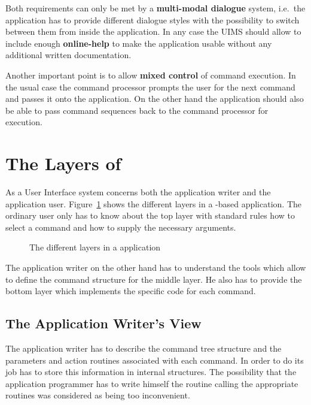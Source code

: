 Both requirements can only be met by a 
\textbf{multi-modal dialogue}
system, i.e.\ the application has to provide different dialogue
styles with the possibility to switch between them from inside the
application. 
In any case the UIMS should allow to include enough 
\textbf{online-help}
to make the application usable without any additional written documentation.

Another important point is to allow 
\textbf{mixed control}
of command execution.
In the usual case the command processor prompts the user for the next
command and passes it onto the application.
On the other hand the application should also be able to pass command
sequences back to the command processor for execution.

%
%
\section{The Layers of \KUIP{}}

As a User Interface system \KUIP{} concerns both the application
writer and the application user.
Figure~\ref{FIG2} shows the different layers in a \KUIP{}-based application.
The ordinary user only has to know about the top layer with standard
rules how to select a command and how to supply the necessary arguments.

\begin{figure}[tb]
\begin{center}
\mbox{}
\end{center}
\caption{The different layers in a \KUIP{} application}
\label{FIG2}
\end{figure}

The application writer on the other hand has to understand the tools
which allow to define the command structure for the middle layer.
He also has to provide the bottom layer which implements the specific code
for each command.

%
%
\subsection{The Application Writer's View}

The application writer has to describe the command tree structure and
the parameters and action routines associated with each command.
In order to do its job \KUIP{} has to store this information in
internal structures.
The possibility that the application programmer has to write himself
the routine calling the appropriate \KUIP{} routines was considered as
being too inconvenient.

